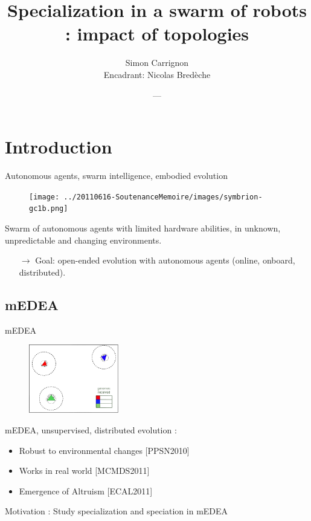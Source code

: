 \documentclass[8pt, handout=show,notes=show]{beamer}
\author[]{Simon Carrignon \\ 
\vfill Encadrant: Nicolas Bred\`{e}che }
\institute[]{
	École~Pratique~des~Hautes~Études, \and TAO/LRI\\
	\pgfdeclareimage[height=0.5cm]{ephe}{../20110616-SoutenanceMemoire/images/logo_ephe_large.jpg} %
	\pgfuseimage{ephe} \hfill \pgfdeclareimage[height=0.5cm]{inria}{../20110616-SoutenanceMemoire/images/taologo.jpg} %
	\pgfuseimage{inria}
	
}
\title{Specialization in a swarm of robots : impact of topologies}
\date{---}
\begin{document}
\begin{frame}
\maketitle

\end{frame}
	\newcommand{\imgSize}{4.2cm}

 \section{Introduction}
\begin{frame}{Autonomous agents, swarm intelligence, embodied evolution}
        \begin{figure}
		\texttt{[image: ../20110616-SoutenanceMemoire/images/symbrion-gc1b.png]}
        \end{figure}
	
	Swarm of autonomous agents with limited hardware abilities, in unknown, unpredictable and changing environments. 
	\begin{itemize}
		\item[$\rightarrow$] Goal: open-ended evolution with autonomous agents (online, onboard, distributed).
	\end{itemize}


\end{frame}
\subsection{mEDEA}

	
\begin{frame}{mEDEA }


\begin{figure}
	\includegraphics[height=3cm]{images/medea0}
\end{figure}
mEDEA, unsupervised, distributed evolution :
	\begin{itemize}
		\item Robust to environmental changes [PPSN2010] \nocite{bredeche11mcmds} 
		\item Works in real world [MCMDS2011] %
		\item Emergence of Altruism [ECAL2011]
	\end{itemize}

\vfill

Motivation : Study specialization and speciation in mEDEA




\end{frame}
\end{document}
